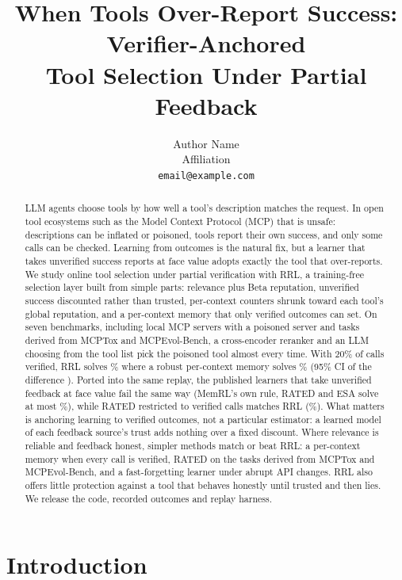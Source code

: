 \documentclass[11pt]{article}
\title{When Tools Over-Report Success: Verifier-Anchored\\
Tool Selection Under Partial Feedback}
\author{Author Name\\Affiliation\\\texttt{email@example.com}}
\date{}
\begin{document}
\maketitle

\begin{abstract}
LLM agents choose tools by how well a tool's description matches the request. In open tool
ecosystems such as the Model Context Protocol (MCP) that is unsafe: descriptions can be inflated
or poisoned, tools report their own success, and only some calls can be checked. Learning from
outcomes is the natural fix, but a learner that takes unverified success reports at face value
adopts exactly the tool that over-reports. We study online tool selection under partial
verification with RRL, a training-free selection layer built from simple parts: relevance plus
Beta reputation, unverified success discounted rather than trusted, per-context counters shrunk
toward each tool's global reputation, and a per-context memory that only verified outcomes can
set. On seven benchmarks, including local MCP servers with a poisoned server and tasks derived
from MCPTox and MCPEvol-Bench, a cross-encoder reranker and an LLM choosing from the tool list pick
the poisoned tool almost every time. With 20\% of calls verified, RRL solves \MspotRRL\% where a
robust per-context memory solves \MspotRobust\% (95\% CI of the difference \MspotVsRobustCI). Ported
into the same replay, the published learners that take unverified feedback at face value fail the
same way (MemRL's own rule, RATED and ESA solve at most \FaceValueMax\%), while RATED restricted to
verified calls matches RRL (\MspotRatedVer\%). What matters is anchoring learning to verified
outcomes, not a particular estimator: a learned model of each feedback source's trust adds nothing
over a fixed discount. Where relevance is reliable and feedback honest, simpler methods match or
beat RRL: a per-context memory when every call is verified, RATED on the tasks derived from MCPTox
and MCPEvol-Bench, and a fast-forgetting learner under abrupt API changes. RRL also offers little
protection against a tool that behaves honestly until trusted and then lies. We release the code,
recorded outcomes and replay harness.
\end{abstract}

\section{Introduction}
\end{document}

